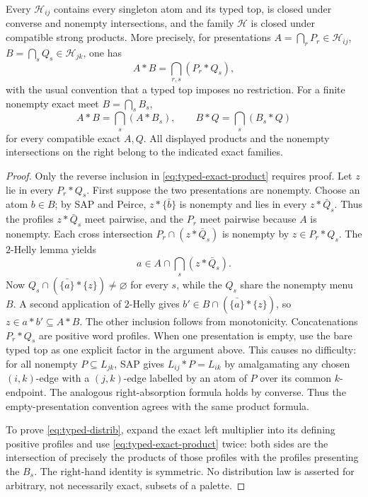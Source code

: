 \begin{lemma}
\label{lem:typed-exact-products}
Every $\mathcal H_{ij}$ contains every singleton atom and its typed
top, is closed under converse and nonempty intersections, and the
family $\mathcal H$ is closed under compatible strong products.
More precisely, for presentations
$A=\bigcap_{r}P_r\in\mathcal H_{ij}$,
$B=\bigcap_{s}Q_s\in\mathcal H_{jk}$, one has
\begin{equation}\label{eq:typed-exact-product}
 A*B=\bigcap_{r,s}(P_r*Q_s),
\end{equation}
with the usual convention that a typed top imposes no restriction.
For a finite nonempty exact meet $B=\bigcap_sB_s$,
\begin{equation}\label{eq:typed-distrib}
 A*B=\bigcap_s(A*B_s),\qquad
 B*Q=\bigcap_s(B_s*Q)
\end{equation}
for every compatible exact $A,Q$.  All displayed products and the
nonempty intersections on the right belong to the indicated exact
families.
\end{lemma}
\begin{proof}
Only the reverse inclusion in \eqref{eq:typed-exact-product} requires
proof.  Let $z$ lie in every $P_r*Q_s$.  First suppose the two
presentations are nonempty.  Choose an atom $b\in B$; by SAP and
Peirce, $z*\bar{\{b\}}$ is nonempty and lies in every
$z*\bar Q_s$.  Thus the profiles $z*\bar Q_s$ meet pairwise,
and the $P_r$ meet pairwise because $A$ is nonempty.  Each cross
intersection $P_r\cap(z*\bar Q_s)$ is nonempty by
$z\in P_r*Q_s$.  The $2$-Helly lemma yields
\[
 a\in A\cap\bigcap_s(z*\bar Q_s).
\]
Now $Q_s\cap(\bar{\{a\}}*\{z\})\ne\varnothing$
for every $s$, while the $Q_s$ share the nonempty menu $B$.
A second application of $2$-Helly gives
$b'\in B\cap(\bar{\{a\}}*\{z\})$, so $z\in a*b'\subseteq A*B$.
The other inclusion follows from monotonicity.  Concatenations
$P_r*Q_s$ are positive word profiles.  When one presentation is empty, use the bare typed top as one
explicit factor in the argument above.  This causes no difficulty:
for all nonempty $P\subseteq L_{jk}$, SAP gives
$L_{ij}*P=L_{ik}$ by amalgamating any chosen $(i,k)$-edge
with a $(j,k)$-edge labelled by an atom of $P$ over its
common $k$-endpoint.  The analogous right-absorption formula
holds by converse.  Thus the empty-presentation convention
agrees with the same product formula.

To prove \eqref{eq:typed-distrib}, expand the exact left multiplier
into its defining positive profiles and use
\eqref{eq:typed-exact-product} twice: both sides are the intersection
of precisely the products of those profiles with the profiles
presenting the $B_s$.  The right-hand identity is symmetric.
No distribution law is asserted for arbitrary, not necessarily
exact, subsets of a palette.
\end{proof}

